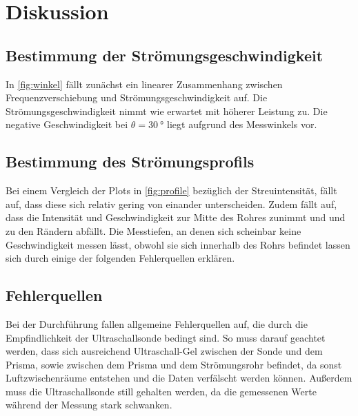 \section{Diskussion}
\label{sec:Diskussion}

\subsection{Bestimmung der Strömungsgeschwindigkeit}

In \autoref{fig:winkel} fällt zunächst ein linearer Zusammenhang zwischen Frequenzverschiebung und Strömungsgeschwindigkeit auf.
Die Strömungsgeschwindigkeit nimmt wie erwartet mit höherer Leistung zu.
Die negative Geschwindigkeit bei $\theta = \qty{30}{°}$ liegt aufgrund des Messwinkels vor.


\subsection{Bestimmung des Strömungsprofils}

Bei einem Vergleich der Plots in \autoref{fig:profile} bezüglich der Streuintensität, fällt auf,
dass diese sich relativ gering von einander unterscheiden. Zudem fällt auf, dass die
Intensität und Geschwindigkeit zur Mitte des Rohres zunimmt und und zu den Rändern abfällt.
Die Messtiefen, an denen sich scheinbar keine Geschwindigkeit messen lässt, obwohl sie sich innerhalb des Rohrs befindet
lassen sich durch einige der folgenden Fehlerquellen erklären.

\subsection{Fehlerquellen}

Bei der Durchführung fallen allgemeine Fehlerquellen auf, die durch die Empfindlichkeit der Ultraschallsonde bedingt sind.
So muss darauf geachtet werden, dass sich ausreichend Ultraschall-Gel zwischen der Sonde und dem Prisma, 
sowie zwischen dem Prisma und dem Strömungsrohr befindet, da sonst Luftzwischenräume entstehen und die Daten verfälscht werden können.
Außerdem muss die Ultraschallsonde still gehalten werden, da die gemessenen Werte während der Messung stark schwanken.